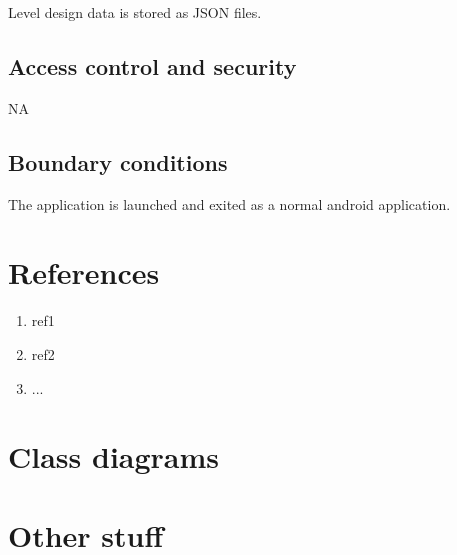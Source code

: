 \documentclass{article}
\begin{document}
Level design data is stored as JSON files.

\subsection{Access control and security}
NA


\subsection{Boundary conditions}
The application is launched and exited as a normal android application.

\section{References}
\begin{enumerate}
  \item ref1
  \item ref2
  \item ...
\end{enumerate}

\newpage
\begin{appendices}
  \section{Class diagrams}
  \section{Other stuff}
\end{appendices}
\end{document}
